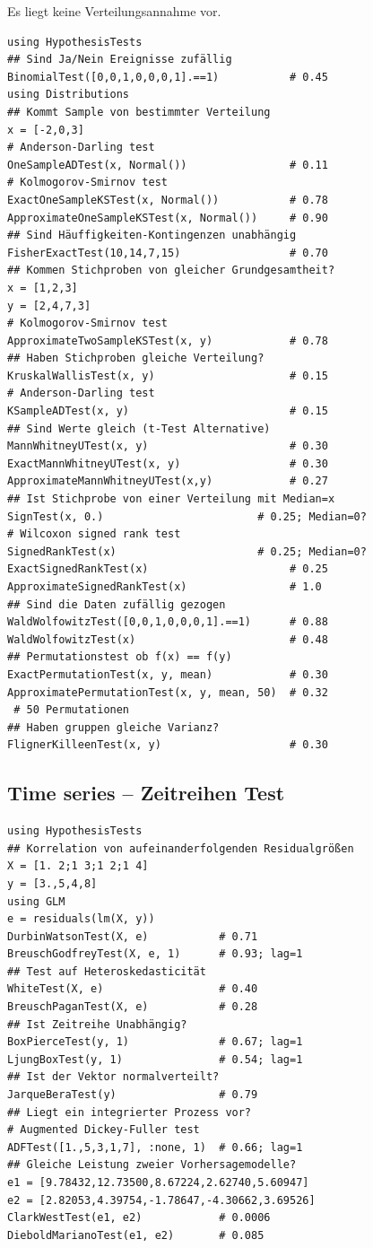 \documentclass[10pt,twocolumn]{scrartcl}
\begin{document}
Es liegt keine Verteilungsannahme vor.

\begin{lstlisting}
using HypothesisTests
## Sind Ja/Nein Ereignisse zufällig
BinomialTest([0,0,1,0,0,0,1].==1)           # 0.45
using Distributions
## Kommt Sample von bestimmter Verteilung
x = [-2,0,3]
# Anderson-Darling test
OneSampleADTest(x, Normal())                # 0.11
# Kolmogorov-Smirnov test
ExactOneSampleKSTest(x, Normal())           # 0.78
ApproximateOneSampleKSTest(x, Normal())     # 0.90
## Sind Häuffigkeiten-Kontingenzen unabhängig
FisherExactTest(10,14,7,15)                 # 0.70
## Kommen Stichproben von gleicher Grundgesamtheit?
x = [1,2,3]
y = [2,4,7,3]
# Kolmogorov-Smirnov test
ApproximateTwoSampleKSTest(x, y)            # 0.78
## Haben Stichproben gleiche Verteilung?
KruskalWallisTest(x, y)                     # 0.15
# Anderson-Darling test
KSampleADTest(x, y)                         # 0.15
## Sind Werte gleich (t-Test Alternative)
MannWhitneyUTest(x, y)                      # 0.30
ExactMannWhitneyUTest(x, y)                 # 0.30
ApproximateMannWhitneyUTest(x,y)            # 0.27
## Ist Stichprobe von einer Verteilung mit Median=x
SignTest(x, 0.)                        # 0.25; Median=0?
# Wilcoxon signed rank test
SignedRankTest(x)                      # 0.25; Median=0?
ExactSignedRankTest(x)                      # 0.25
ApproximateSignedRankTest(x)                # 1.0
## Sind die Daten zufällig gezogen
WaldWolfowitzTest([0,0,1,0,0,0,1].==1)      # 0.88
WaldWolfowitzTest(x)                        # 0.48
## Permutationstest ob f(x) == f(y)
ExactPermutationTest(x, y, mean)            # 0.30
ApproximatePermutationTest(x, y, mean, 50)  # 0.32
 # 50 Permutationen
## Haben gruppen gleiche Varianz?
FlignerKilleenTest(x, y)                    # 0.30
\end{lstlisting}

\subsection{Time series -- Zeitreihen Test}

\begin{lstlisting}
using HypothesisTests
## Korrelation von aufeinanderfolgenden Residualgrößen
X = [1. 2;1 3;1 2;1 4]
y = [3.,5,4,8]
using GLM
e = residuals(lm(X, y))
DurbinWatsonTest(X, e)           # 0.71
BreuschGodfreyTest(X, e, 1)      # 0.93; lag=1
## Test auf Heteroskedasticität
WhiteTest(X, e)                  # 0.40
BreuschPaganTest(X, e)           # 0.28
## Ist Zeitreihe Unabhängig?
BoxPierceTest(y, 1)              # 0.67; lag=1
LjungBoxTest(y, 1)               # 0.54; lag=1
## Ist der Vektor normalverteilt?
JarqueBeraTest(y)                # 0.79
## Liegt ein integrierter Prozess vor?
# Augmented Dickey-Fuller test
ADFTest([1.,5,3,1,7], :none, 1)  # 0.66; lag=1
## Gleiche Leistung zweier Vorhersagemodelle?
e1 = [9.78432,12.73500,8.67224,2.62740,5.60947]
e2 = [2.82053,4.39754,-1.78647,-4.30662,3.69526]
ClarkWestTest(e1, e2)            # 0.0006
DieboldMarianoTest(e1, e2)       # 0.085
\end{lstlisting}
\end{document}
